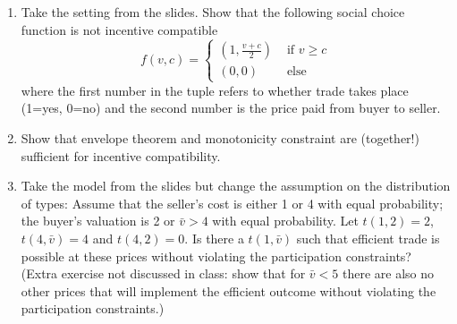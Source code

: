 \documentclass[a4paper,12pt]{article}
\begin{document}
\begin{enumerate}
\item Take the setting from the slides. Show that the following social choice function is not incentive compatible
  $$f(v,c)=
  \begin{cases}
    (1,\frac{v+c}{2})&\text{ if }v\geq c\\
    (0,0) &\text{ else}
  \end{cases}
$$
  where the first number in the tuple refers to whether trade takes place (1=yes, 0=no) and the second number is the price paid from buyer to seller.
\item Show that envelope theorem and monotonicity constraint are (together!) sufficient for incentive compatibility.
\item Take the model from the slides but change the assumption on the distribution of types: Assume that the seller's cost is either 1 or 4 with equal probability; the buyer's valuation is 2 or $\bar v>4$ with equal probability. Let $t(1,2)=2$, $t(4,\bar v)=4$ and $t(4,2)=0$. 
  Is there a $t(1,\bar v)$ such that efficient trade is possible at these prices without violating the participation constraints? \\(Extra exercise not discussed in class: show that for $\bar v<5$ there are also no other prices that will implement the efficient outcome without violating the participation constraints.)
\end{enumerate}
\end{document}
